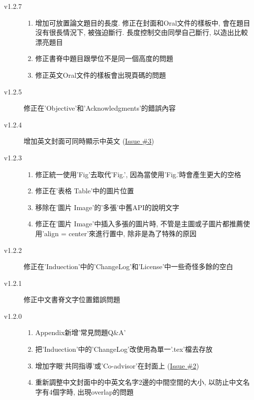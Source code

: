\begin{description}
  \item[v1.2.7] \hfill
    \begin{enumerate}
      \item 增加可放置論文題目的長度. 修正在封面和Oral文件的樣板中, 會在題目沒有很長情況下, 被強迫斷行. 長度控制交由同學自己斷行, 以造出比較漂亮題目
      \item 修正書脊中題目跟學位不是同一個高度的問題
      \item 修正英文Oral文件的樣板會出現頁碼的問題
    \end{enumerate}

  \item[v1.2.5] 修正在'Objective'和'Acknowledgments'的錯誤內容

  \item[v1.2.4] 增加英文封面可同時顯示中英文 (\href{https://github.com/wengan-li/ncku-thesis-templete-latex/issues/3}{Issue \#3})

  \item[v1.2.3] \hfill
    \begin{enumerate}
      \item 修正統一使用'Fig'去取代'Fig.', 因為當使用'Fig.'時會產生更大的空格
      \item 修正在'表格 Table'中的圖片位置
      \item 移除在'圖片 Image'的'多張'中舊API的說明文字
      \item 修正在'圖片 Image'中插入多張的圖片時, 不管是主圖或子圖片都推薦使用'align = center'來進行置中, 除非是為了特殊的原因
    \end{enumerate}

  \item[v1.2.2] 修正在'Induection'中的'ChangeLog'和'License'中一些奇怪多餘的空白

  \item[v1.2.1] 修正中文書脊文字位置錯誤問題

  \item[v1.2.0] \hfill
    \begin{enumerate}
      \item Appendix新增'常見問題Q\&A'
      \item 把'Induection'中的'ChangeLog'改使用為單一'.tex'檔去存放
      \item 增加字眼'共同指導'或'Co-advisor'在封面上 (\href{https://github.com/wengan-li/ncku-thesis-templete-latex/issues/2}{Issue \#2})
      \item 重新調整中文封面中的中英文名字2邊的中間空間的大小, 以防止中文名字有4個字時, 出現overlap的問題
    \end{enumerate}


\end{description}
